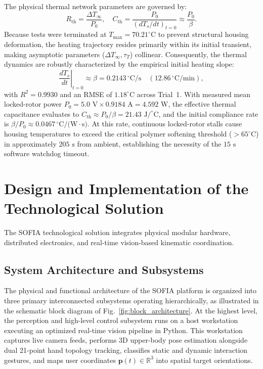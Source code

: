 \documentclass[lettersize,journal]{IEEEtran}
\begin{document}
	The physical thermal network parameters are governed by:
	\begin{equation}
		R_{\text{th}} = \frac{\Delta T_\infty}{P_0}, \quad C_{\text{th}} = \frac{P_0}{(dT_s/dt)_{t=0}} \approx \frac{P_0}{\beta}.
		\label{eq:thermal_parameters}
	\end{equation}
	Because tests were terminated at $T_{\max} = 70.21^\circ\text{C}$ to prevent structural housing deformation, the heating trajectory resides primarily within its initial transient, making asymptotic parameters ($\Delta T_\infty, \tau_T$) collinear. Consequently, the thermal dynamics are robustly characterized by the empirical initial heating slope:
	\begin{equation}
		\left.\frac{dT_s}{dt}\right|_{t=0} \approx \beta = 0.2143\,^\circ\text{C/s} \quad (12.86\,^\circ\text{C/min}),
		\label{eq:heating_rate}
	\end{equation}
	with $R^2 = 0.9930$ and an RMSE of $1.18^\circ\text{C}$ across Trial~1. With measured mean locked-rotor power $P_0 = 5.0\text{ V} \times 0.9184\text{ A} = 4.592\text{ W}$, the effective thermal capacitance evaluates to $C_{\text{th}} \approx P_0 / \beta = 21.43\text{ J/}^\circ\text{C}$, and the initial compliance rate is $\beta / P_0 \approx 0.0467\,^\circ\text{C/(W}\cdot\text{s)}$. At this rate, continuous locked-rotor stalls cause housing temperatures to exceed the critical polymer softening threshold ($> 65^\circ\text{C}$) in approximately $205\text{ s}$ from ambient, establishing the necessity of the $15\text{ s}$ software watchdog timeout.
	
	
	
	\section{Design and Implementation of the Technological Solution}
	\label{sec:design}
	
	The SOFIA technological solution integrates physical modular hardware, distributed electronics, and real-time vision-based kinematic coordination.
	
	\subsection{System Architecture and Subsystems}
	\label{sec:system_architecture}
	
	The physical and functional architecture of the SOFIA platform is organized into three primary interconnected subsystems operating hierarchically, as illustrated in the schematic block diagram of Fig.~\ref{fig:block_architecture}. At the highest level, the perception and high-level control subsystem runs on a host workstation executing an optimized real-time vision pipeline in Python. This workstation captures live camera feeds, performs 3D upper-body pose estimation alongside dual 21-point hand topology tracking, classifies static and dynamic interaction gestures, and maps user coordinates $\mathbf{p}(t) \in \mathbb{R}^3$ into spatial target orientations.
	
\end{document}
